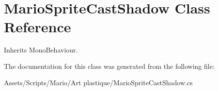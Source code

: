 \hypertarget{class_mario_sprite_cast_shadow}{\section{Mario\-Sprite\-Cast\-Shadow Class Reference}
\label{class_mario_sprite_cast_shadow}
}


Inherits Mono\-Behaviour.



The documentation for this class was generated from the following file\-:\begin{DoxyCompactItemize}
\item 
Assets/\-Scripts/\-Mario/\-Art plastique/Mario\-Sprite\-Cast\-Shadow.\-cs\end{DoxyCompactItemize}
